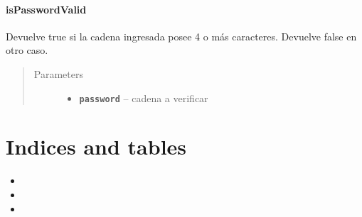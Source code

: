 \documentclass[letterpaper,10pt,english]{sphinxmanual}
\begin{document}
\subsubsection{isPasswordValid}
\label{Utils/FieldValidator:ispasswordvalid}

\begin{fulllineitems}
\label{Utils/FieldValidator:com.fiuba.tallerii.jobify.FieldValidator.isPasswordValid(String)}
Devuelve true si la cadena ingresada posee 4 o más caracteres. Devuelve false en otro caso.
\begin{quote}\begin{description}
\item[{Parameters}] \leavevmode\begin{itemize}
\item {} 
\textbf{\texttt{password}} -- cadena a verificar

\end{itemize}

\end{description}\end{quote}

\end{fulllineitems}



\chapter{Indices and tables}
\label{index:indices-and-tables}\begin{itemize}
\item {} 

\item {} 

\item {} 

\end{itemize}



\renewcommand{\indexname}{Index}
\printindex
\end{document}
